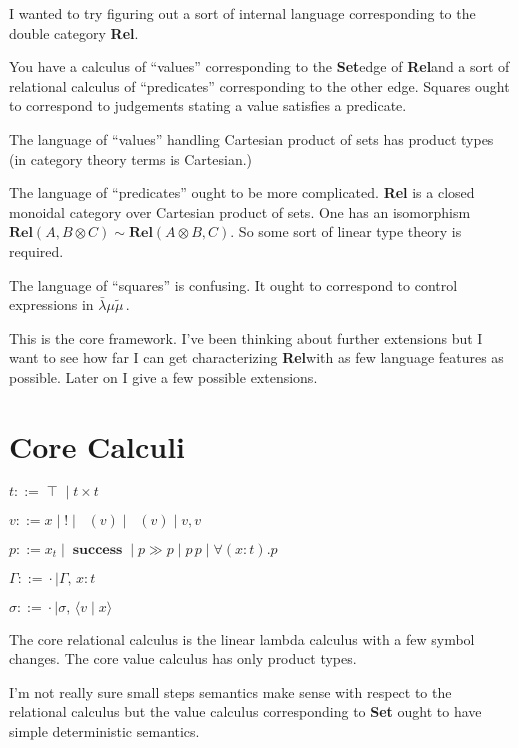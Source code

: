 \documentclass[twocolumn]{scrartcl}
\newcommand{\Rel}{\textbf{Rel}}
\newcommand{\Set}{\textbf{Set}}
\newcommand{\lk}{\(\bar{\lambda}\mu\tilde{\mu}\,\)}
\newcommand{\bnfdef}{\mathrel{::=}}
\DeclareMathOperator{\unit}{\top}
\DeclareMathOperator{\coin}{\textbf{!}}
\DeclareMathOperator{\fst}{\pi_1}
\DeclareMathOperator{\snd}{\pi_2}
\DeclareMathOperator{\success}{\textbf{success}}
\newcommand{\pass}{\mathbin{\gg}}
\begin{document}
I wanted to try figuring out a sort of internal language corresponding
to the double category \Rel.

You have a calculus of ``values'' corresponding to the \Set edge of
\Rel and a sort of relational calculus of ``predicates'' corresponding
to the other edge. Squares ought to correspond to judgements stating a
value satisfies a predicate.

The language of ``values'' handling Cartesian product of sets has
product types (in category theory terms is Cartesian.)

The language of ``predicates'' ought to be more complicated. \Rel
is a closed monoidal category over Cartesian product of sets.  One has
an isomorphism \( \Rel(A, B \otimes C) \sim \Rel (A \otimes B, C) \).
So some sort of linear type theory is required.

The language of ``squares'' is confusing. It ought to correspond to
control expressions in \lk.

This is the core framework.  I've been thinking about further
extensions but I want to see how far I can get characterizing
\Rel with as few language features as possible.  Later on I
give a few possible extensions.

\section*{Core Calculi}

\begin{description}[nosep]
\item[Types] \hfill \( t \bnfdef \unit \mid t \times t \)
\item[Values] \hfill \( v \bnfdef x \mid \coin \mid \fst(v) \mid \snd(v) \mid v , v \)
\item[Predicates] \hfill \( p \bnfdef x_t \mid \success \mid p \pass p \mid p \, p \mid \forall (x \colon t) . p \)
\item[Environment] \hfill \( \Gamma \bnfdef \cdot \mid \Gamma , \, x \colon t  \)
\item[Substitutions] \hfill \( \sigma \bnfdef \cdot \mid \sigma , \, \langle v \mid x \rangle  \)
\end{description}

The core relational calculus is the linear lambda calculus with a few
symbol changes.  The core value calculus has only product types.

I'm not really sure small steps semantics make sense with respect to
the relational calculus but the value calculus corresponding to \Set
ought to have simple deterministic semantics.
\end{document}
